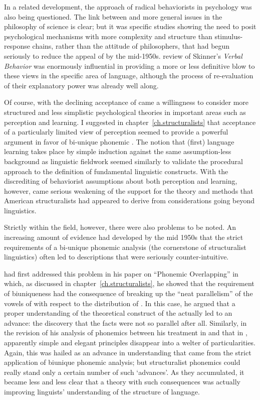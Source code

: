In a related development, the approach of radical behaviorists in
psychology was also being questioned. The link between  and
more general issues in the philosophy of science is clear; but it was
specific studies showing the need to posit psychological mechanisms
with more complexity and structure than stimulus-response chains,
rather than the attitude of philosophers, that had begun seriously to
reduce the appeal of  by the
mid-1950s.  review of Skinner's
\textsl{Verbal Behavior} was enormously influential in providing a
more or less definitive blow to these views in the specific area of
language, although the process of re-evaluation of their explanatory
power was already well along.

Of course, with the declining acceptance of  came a
willingness to consider more structured and less simplistic
psychological theories in important areas such as perception and
learning. I suggested in chapter~\ref{ch.structuralists} that
acceptance of a particularly limited view of perception seemed to
provide a powerful argument in favor of bi-unique phonemic
. The notion that (first) language learning takes place
by simple induction against the same assumption-less background as
linguistic fieldwork seemed similarly to validate the procedural
approach to the definition of fundamental linguistic constructs. With
the discrediting of behaviorist assumptions about both perception and
learning, however, came serious weakening of the support for the
theory and methods that American structuralists had appeared to derive
from considerations going beyond linguistics.

Strictly within the field, however, there were also problems to be
noted. An increasing amount of evidence had developed by the mid 1950s
that the strict requirements of a bi-unique phonemic analysis (the
cornerstone of structuralist linguistics) often led to descriptions
that were seriously counter-intuitive.

\citet{bloch41:overlapping} had first addressed this problem in his
paper on ``Phonemic Overlapping'' in which, as discussed in
chapter~\ref{ch.structuralists}, he showed that the requirement of
biuniqueness had the consequence of breaking up the ``neat
parallelism'' of the vowels of  with respect to the
distribution of . In this case, he argued that a proper
understanding of the theoretical construct of the  actually led
to an advance: the discovery that the facts were not so parallel after
all. Similarly, in the revision of his analysis of  phonemics
between his treatment in \citealt{bloch46:japanese.syntax} and that in
\citealt{bloch50:japanese}, apparently simple and elegant principles
disappear into a welter of particularities. Again, this was hailed as
an advance in understanding that came from the strict application of
biunique phonemic analysis; but structuralist phonemics could really
stand only a certain number of such `advances'. As they accumulated,
it became less and less clear that a theory with such consequences was
actually improving linguists' understanding of the structure of
language.

